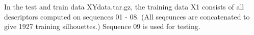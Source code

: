 
In the test and train data XYdata.tar.gz, the training data X1 consists of all
descriptors computed on sequences 01 - 08. (All seqeunces are concatenated to
give 1927 training silhouettes.) Sequence 09 is used for testing.

